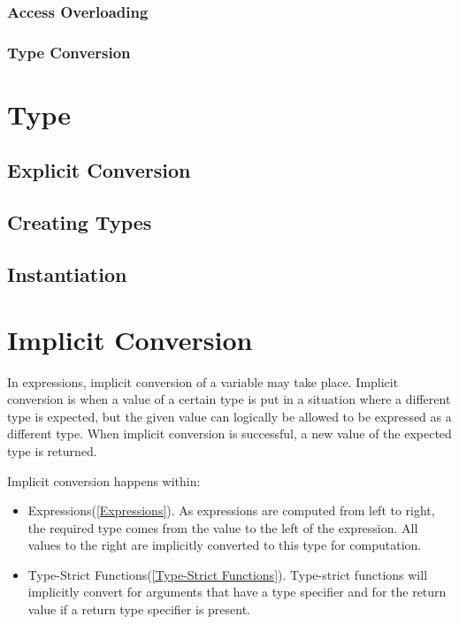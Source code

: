 \documentclass[12pt,letterpaper]{report}
\begin{document}
\subsubsection{Access Overloading}\label{Access Overloading}
\subsubsection{Type Conversion}\label{Type Conversion}




\section{Type}\label{Type}
\subsection{Explicit Conversion}\label{Explicit Conversion}
\subsection{Creating Types}\label{Creating Types}
\subsection{Instantiation}\label{Instantiation}
\section{Implicit Conversion}\label{Implicit Conversion}

In expressions, implicit conversion of a variable may take place. Implicit conversion is when 
a value of a certain type is put in a situation where a different type is expected, but the 
given value can logically be allowed to be expressed as a different type. When implicit 
conversion is successful, a new value of the expected type is returned.

Implicit conversion happens within:
\begin{itemize}
  \item Expressions(\autoref{Expressions}). As expressions are computed from left to right, the required type comes from the value to the left of the expression. All values to the right are implicitly converted to this type for computation.
  \item Type-Strict Functions(\autoref{Type-Strict Functions}). Type-strict functions will implicitly convert for arguments that have a type specifier and for the return value if a return type specifier is present.
\end{itemize}
\end{document}
